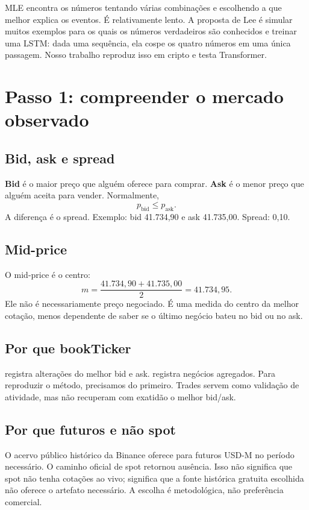 \documentclass[12pt,a4paper,openany]{report}
\begin{document}
MLE encontra os números tentando várias combinações e escolhendo a que melhor explica
os eventos. É relativamente lento. A proposta de Lee é simular muitos exemplos para
os quais os números verdadeiros são conhecidos e treinar uma LSTM: dada uma sequência,
ela cospe os quatro números em uma única passagem. Nosso trabalho reproduz isso em
cripto e testa Transformer.

\chapter{Passo 1: compreender o mercado observado}

\section{Bid, ask e spread}

\textbf{Bid} é o maior preço que alguém oferece para comprar. \textbf{Ask} é o menor
preço que alguém aceita para vender. Normalmente,
\[
 p_{\mathrm{bid}}\le p_{\mathrm{ask}}.
\]
A diferença é o spread. Exemplo: bid 41.734,90 e ask 41.735,00. Spread: 0,10.

\section{Mid-price}

O mid-price é o centro:
\[
 m=\frac{41.734{,}90+41.735{,}00}{2}=41.734{,}95.
\]
Ele não é necessariamente preço negociado. É uma medida do centro da melhor cotação,
menos dependente de saber se o último negócio bateu no bid ou no ask.

\section{Por que bookTicker}

 registra alterações do melhor bid e ask. 
registra negócios agregados. Para reproduzir o método, precisamos do primeiro. Trades
servem como validação de atividade, mas não recuperam com exatidão o melhor bid/ask.

\section{Por que futuros e não spot}

O acervo público histórico da Binance oferece  para futuros USD-M
no período necessário. O caminho oficial de spot retornou ausência. Isso não significa
que spot não tenha cotações ao vivo; significa que a fonte histórica gratuita escolhida
não oferece o artefato necessário. A escolha é metodológica, não preferência comercial.
\end{document}
